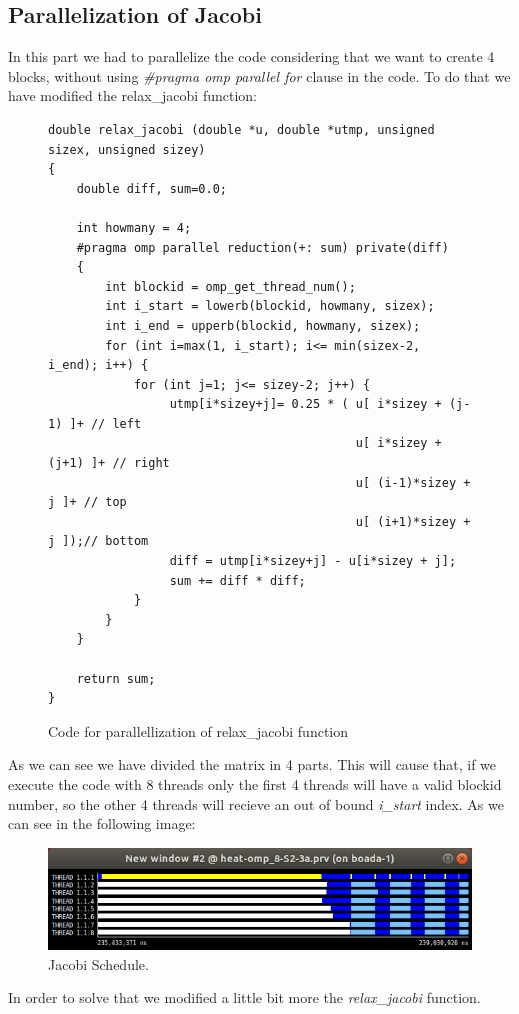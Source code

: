 \documentclass[12pt, a4paper]{article}
\begin{document}
\subsection{Parallelization of Jacobi}

In this part we had to parallelize the code considering that we want to create 4 blocks, without using \textit{\#pragma omp parallel for} clause in the code. To do that we have modified the relax\_jacobi function:

 \begin{figure}[H]
\begin{lstlisting}
double relax_jacobi (double *u, double *utmp, unsigned sizex, unsigned sizey)
{
	double diff, sum=0.0;

	int howmany = 4;
	#pragma omp parallel reduction(+: sum) private(diff)
	{
		int blockid = omp_get_thread_num();
		int i_start = lowerb(blockid, howmany, sizex);
		int i_end = upperb(blockid, howmany, sizex);
		for (int i=max(1, i_start); i<= min(sizex-2, i_end); i++) {
			for (int j=1; j<= sizey-2; j++) {
				 utmp[i*sizey+j]= 0.25 * ( u[ i*sizey + (j-1) ]+ // left
										   u[ i*sizey + (j+1) ]+ // right
							   			   u[ (i-1)*sizey + j ]+ // top
							               u[ (i+1)*sizey + j ]);// bottom
				 diff = utmp[i*sizey+j] - u[i*sizey + j];
				 sum += diff * diff; 
			}
		}
	}

    return sum;
}
\end{lstlisting}
\caption{Code for parallellization of relax\_jacobi function}
\end{figure}

As we can see we have divided the matrix in 4 parts. This will cause that, if we execute the code with 8 threads only the first 4 threads will have a valid blockid number, so the other 4 threads will recieve an out of bound \textit{i\_start} index. As we can see in the following image:

\begin{figure}[H]
	\centering
	\includegraphics[scale=0.50]{./images/paraver-jacobi-s2-3a.png}
	\caption{Jacobi Schedule.}
\end{figure}

In order to solve that we modified a little bit more the \textit{relax\_jacobi} function.
\end{document}
